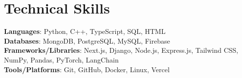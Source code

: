 \documentclass[letterpaper,11pt]{article}
\begin{document}
%
\section{Technical Skills}
 \begin{itemize}[leftmargin=0.15in, label={}]
    \small{\item{
     \textbf{Languages}{: Python, C++, TypeScript, SQL, HTML} \\
     \textbf{Databases}{: MongoDB, PostgreSQL, MySQL, Firebase} \\
      \textbf{Frameworks/Libraries}{: Next.js, Django, Node.js, Express.js, Tailwind CSS, NumPy, Pandas, PyTorch, LangChain} \\
     \textbf{Tools/Platforms}{: Git, GitHub, Docker, Linux, Vercel}
    }}
 \end{itemize}




\end{document}
